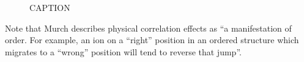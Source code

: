 \documentclass[aps,prb,twocolumn,superscriptaddress,reprint]{revtex4-1}
\begin{document}
\begin{figure}[tb]
  \centering
    \caption{\label{fig:conductivity_miniplots}CAPTION}
\end{figure}

Note that Murch describes physical correlation effects as ``a manifestation of order. For example, an ion on a ``right'' position in an ordered structure which migrates to a ``wrong'' position will tend to reverse that jump''.\cite{Murch_SolStatIonics1982}


\end{document}
